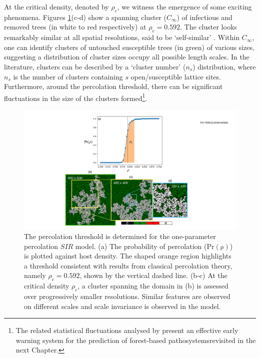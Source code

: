 At the critical density, denoted by $\rho_c$, we witness the emergence of some exciting phenomena.
Figures \ref{fig:ch3-perc}(c-d) show a spanning cluster ($C_\infty$) of infectious and removed trees (in white to red respectively) at $\rho_c=0.592$.
The cluster looks remarkably similar at all spatial resolutions, said to be `self-similar' \cite{Kapitulnik_1983}.
Within $C_\infty$, one can identify clusters of untouched susceptible trees (in green) of various sizes, suggesting a distribution of cluster sizes occupy all possible length scales.
In the literature, clusters can be described by a `cluster number' ($n_s$) distribution, where $n_s$ is the number of clusters containing $s$ open/susceptible lattice sites.
Furthermore, around the percolation threshold, there can be significant fluctuations in the size of the clusters formed\footnote{
The related statistical fluctuations analysed by \cite{OROZCOFUENTES201912}
present an effective early warning system for the prediction of forest-based pathosystems\textemdash revisited in the next Chapter.
}.

\begin{figure}
    \centering
    \includegraphics[scale=0.4]{chapter3/figures/figure2-1param-perc-threshold.pdf}
    \caption{The percolation threshold is determined for the one-parameter percolation $SIR$ model.
            (a) The probability of percolation ($\mathrm{Pr(\rho)}$) is plotted against host density.
            The shaped orange region highlights a threshold consistent with results from classical percolation theory, 
            namely $\rho_c = 0.592$, shown by the vertical dashed line. 
            (b-c) At the critical density $\rho_c$, a cluster spanning the domain in (b) is assessed over progressively smaller resolutions.
            Similar features are observed on different scales and scale invariance is observed in the model.
            }
    \label{fig:ch3-perc}
\end{figure}

